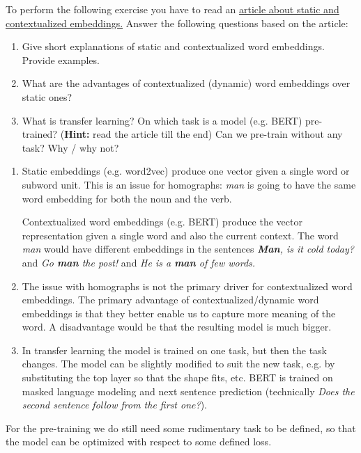 \begin{exercise}[Embeddings] [1 + 0.5 + 0.5 = 2]

    To perform the following exercise you have to read an \href{https://towardsdatascience.com/from-pre-trained-word-embeddings-to-pre-trained-language-models-focus-on-bert-343815627598}{article about static and contextualized embeddings.} Answer the following questions based on the article:

    \begin{enumerate}
        \item Give short explanations of static and contextualized word embeddings. Provide examples.
        \item What are the advantages of contextualized (dynamic) word embeddings over static ones?
        \item What is transfer learning? On which task is a model (e.g. BERT) pre-trained? (\textbf{Hint:} read the article till the end) Can we pre-train without any task? Why / why not?
    \end{enumerate}
        
\end{exercise}

\begin{solution}
    \begin{enumerate}
    \item Static embeddings (e.g. word2vec) produce one vector given a single word or subword unit. This is an issue for homographs: \textit{man} is going to have the same word embedding for both the noun and the verb.
    
    Contextualized word embeddings (e.g. BERT) produce the vector representation given a single word and also the current context. The word \textit{man} would have different embeddings in the sentences \textit{\textbf{Man}, is it cold today?} and \textit{Go \textbf{man} the post!} and \textit{He is a \textbf{man} of few words.}
    
    \item The issue with homographs is not the primary driver for contextualized word embeddings. The primary advantage of contextualized/dynamic word embeddings is that they better enable us to capture more meaning of the word. A disadvantage would be that the resulting model is much bigger.
    
    \item In transfer learning the model is trained on one task, but then the task changes. The model can be slightly modified to suit the new task, e.g. by substituting the top layer so that the shape fits, etc. BERT is trained on masked language modeling and next sentence prediction (technically \textit{Does the second sentence follow from the first one?}).
    \end{enumerate}
    
    For the pre-training we do still need some rudimentary task to be defined, so that the model can be optimized with respect to some defined loss.
\end{solution}

